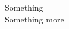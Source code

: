\documentclass{book}
\begin{document}
\begin{codigo}
Something\\
Something more
\end{codigo}
\end{document}
